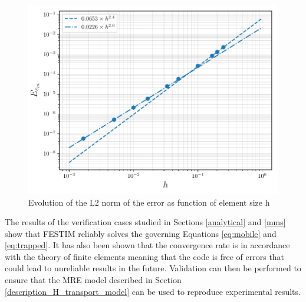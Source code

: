 \begin{figure}
    \centering
    \includegraphics[width=1\linewidth]{"Figures/Chapter3/L2 error on Cm vs h"}
    \caption{Evolution of the L2 norm of the error as function of element size h}
    \label{fig:error vs h}
\end{figure}

The results of the verification cases studied in Sections \ref{analytical} and \ref{mms} show that FESTIM reliably solves the governing Equations \ref{eq:mobile} and \ref{eq:trapped}.
It has also been shown that the convergence rate is in accordance with the theory of finite elements meaning that the code is free of errors that could lead to unreliable results in the future.
Validation can then be performed to ensure that the MRE model described in Section \ref{description_H_transport_model} can be used to reproduce experimental results.

